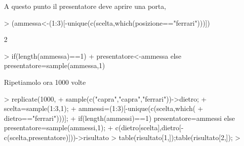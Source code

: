 \documentclass[onecolumn,11pt]{book}
\begin{document}
A questo punto  il presentatore deve aprire una porta, 
\begin{Schunk}
\begin{Sinput}
> (ammessa<-(1:3)[-unique(c(scelta,which(posizione=="ferrari")))])
\end{Sinput}
\begin{Soutput}
[1] 2
\end{Soutput}
\begin{Sinput}
> if(length(ammessa)==1) 
+ presentatore<-ammessa else presentatore=sample(ammessa,1)
\end{Sinput}
\end{Schunk}
Ripetiamolo ora 1000 volte
\begin{Schunk}
\begin{Sinput}
> replicate(1000,{
+ sample(c("capra","capra","ferrari"))->dietro;
+ scelta=sample(1:3,1);  
+ ammessi=(1:3)[-unique(c(scelta,which(
+ dietro=="ferrari")))];
+ if(length(ammessi)==1) {presentatore=ammessi} else {presentatore=sample(ammessi,1)};
+ c(dietro[scelta],dietro[-c(scelta,presentatore)])})->risultato
> table(risultato[1,]);table(risultato[2,]);
> 
\end{Sinput}
\end{Schunk}
\end{document}
